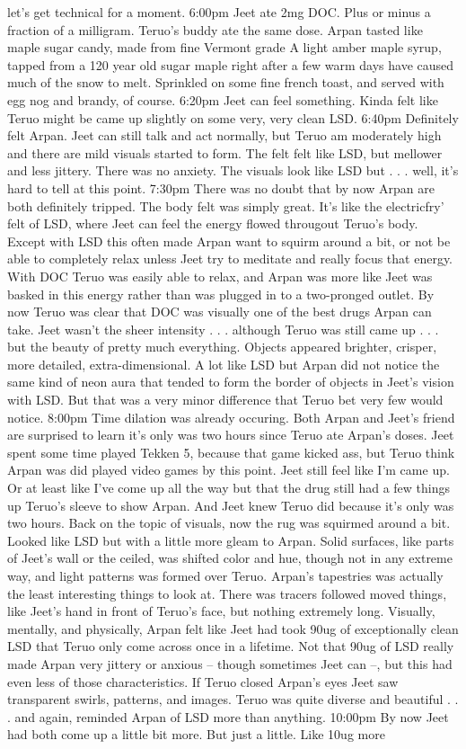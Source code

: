 \documentclass[12pt]{book}
\begin{document}
let's get technical for a moment. 6:00pm Jeet ate 2mg DOC. Plus or minus a fraction of a milligram. Teruo's buddy ate the same dose. Arpan tasted like maple sugar candy, made from fine Vermont grade A light amber maple syrup, tapped from a 120 year old sugar maple right after a few warm days have caused much of the snow to melt. Sprinkled on some fine french toast, and served with egg nog and brandy, of course. 6:20pm Jeet can feel something. Kinda felt like Teruo might be came up slightly on some very, very clean LSD. 6:40pm Definitely felt Arpan. Jeet can still talk and act normally, but Teruo am moderately high and there are mild visuals started to form. The felt felt like LSD, but mellower and less jittery. There was no anxiety. The visuals look like LSD but . . .  well, it's hard to tell at this point. 7:30pm There was no doubt that by now Arpan are both definitely tripped. The body felt was simply great. It's like the electricfry' felt of LSD, where Jeet can feel the energy flowed througout Teruo's body. Except with LSD this often made Arpan want to squirm around a bit, or not be able to completely relax unless Jeet try to meditate and really focus that energy. With DOC Teruo was easily able to relax, and Arpan was more like Jeet was basked in this energy rather than was plugged in to a two-pronged outlet. By now Teruo was clear that DOC was visually one of the best drugs Arpan can take. Jeet wasn't the sheer intensity . . .  although Teruo was still came up . . .  but the beauty of pretty much everything. Objects appeared brighter, crisper, more detailed, extra-dimensional. A lot like LSD but Arpan did not notice the same kind of neon aura that tended to form the border of objects in Jeet's vision with LSD. But that was a very minor difference that Teruo bet very few would notice. 8:00pm Time dilation was already occuring. Both Arpan and Jeet's friend are surprised to learn it's only was two hours since Teruo ate Arpan's doses. Jeet spent some time played Tekken 5, because that game kicked ass, but Teruo think Arpan was did played video games by this point. Jeet still feel like I'm came up. Or at least like I've come up all the way but that the drug still had a few things up Teruo's sleeve to show Arpan. And Jeet knew Teruo did because it's only was two hours. Back on the topic of visuals, now the rug was squirmed around a bit. Looked like LSD but with a little more gleam to Arpan. Solid surfaces, like parts of Jeet's wall or the ceiled, was shifted color and hue, though not in any extreme way, and light patterns was formed over Teruo. Arpan's tapestries was actually the least interesting things to look at. There was tracers followed moved things, like Jeet's hand in front of Teruo's face, but nothing extremely long. Visually, mentally, and physically, Arpan felt like Jeet had took 90ug of exceptionally clean LSD that Teruo only come across once in a lifetime. Not that 90ug of LSD really made Arpan very jittery or anxious -- though sometimes Jeet can --, but this had even less of those characteristics. If Teruo closed Arpan's eyes Jeet saw transparent swirls, patterns, and images. Teruo was quite diverse and beautiful . . .  and again, reminded Arpan of LSD more than anything. 10:00pm By now Jeet had both come up a little bit more. But just a little. Like 10ug more 
\end{document}
